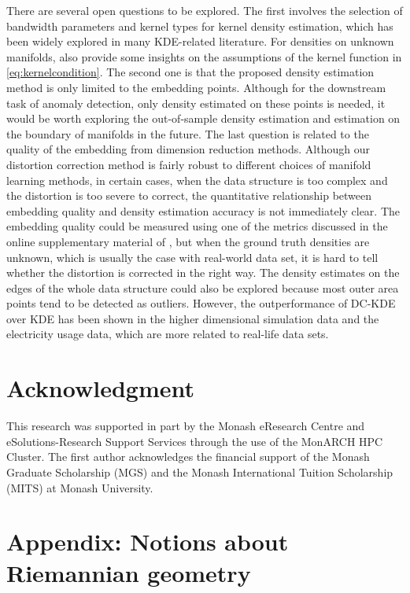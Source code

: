 \documentclass[11pt,a4paper,]{article}
\begin{document}
There are several open questions to be explored. The first involves the selection of bandwidth parameters and kernel types for kernel density estimation, which has been widely explored in many KDE-related literature. For densities on unknown manifolds, \textcite{Berenfeld2021-as} also provide some insights on the assumptions of the kernel function in \eqref{eq:kernelcondition}. The second one is that the proposed density estimation method is only limited to the embedding points. Although for the downstream task of anomaly detection, only density estimated on these points is needed, it would be worth exploring the out-of-sample density estimation and estimation on the boundary of manifolds \autocite{Berry2017-rz} in the future.
The last question is related to the quality of the embedding from dimension reduction methods. Although our distortion correction method is fairly robust to different choices of manifold learning methods, in certain cases, when the data structure is too complex and the distortion is too severe to correct, the quantitative relationship between embedding quality and density estimation accuracy is not immediately clear. The embedding quality could be measured using one of the metrics discussed in the online supplementary material of \textcite{Cheng2021-dh}, but when the ground truth densities are unknown, which is usually the case with real-world data set, it is hard to tell whether the distortion is corrected in the right way. The density estimates on the edges of the whole data structure could also be explored because most outer area points tend to be detected as outliers. However, the outperformance of DC-KDE over KDE has been shown in the higher dimensional simulation data and the electricity usage data, which are more related to real-life data sets.

\hypertarget{acknowledgment}{%
\section*{Acknowledgment}\label{acknowledgment}}

This research was supported in part by the Monash eResearch Centre and eSolutions-Research Support Services through the use of the MonARCH HPC Cluster. The first author acknowledges the financial support of the Monash Graduate Scholarship (MGS) and the Monash International Tuition Scholarship (MITS) at Monash University.

\appendix

\hypertarget{riemgeo}{%
\section{Appendix: Notions about Riemannian geometry}\label{riemgeo}}
\end{document}

